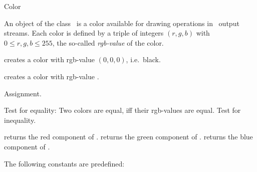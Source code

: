 

\begin{ccRefClass}{Color}  %


\ccDefinition
An object of the class \ccRefName\ is a color available
for drawing operations in \cgal\ output streams.
Each color is defined by a triple of integers $(r,g,b)$ with
$0\le r,g,b \le 255$, the so-called {\em rgb-value} of the color.  






\ccCreation
{}  %


             {creates a color with rgb-value $(0,0,0)$, i.e.\ black.}

             {creates a color with rgb-value .}


\ccOperations

\ccHidden {}
        {Assignment.}

       {Test for equality: Two colors are equal, iff their 
        rgb-values are equal.}
\ccGlue
{}
       {Test for inequality.}

       {returns the  red component of \ccVar.}
\ccGlue
{}
       {returns the  green component of \ccVar.}
\ccGlue
{}
       {returns the blue component of \ccVar.}

\ccConstants

The following constants are predefined:


\end{ccRefClass}
